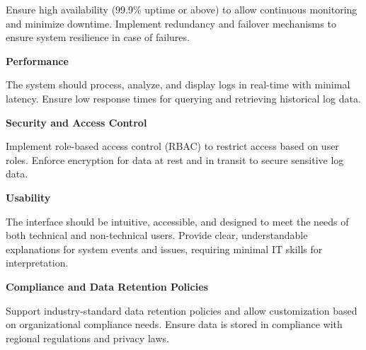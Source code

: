 Ensure high availability (99.9\% uptime or above) to allow continuous monitoring and minimize downtime. Implement redundancy and failover mechanisms to ensure system resilience in case of failures.

\textbf{Performance}

The system should process, analyze, and display logs in real-time with minimal latency. Ensure low response times for querying and retrieving historical log data.

\textbf{Security and Access Control}

Implement role-based access control (RBAC) to restrict access based on user roles. Enforce encryption for data at rest and in transit to secure sensitive log data.

\textbf{Usability}

The interface should be intuitive, accessible, and designed to meet the needs of both technical and non-technical users. Provide clear, understandable explanations for system events and issues, requiring minimal IT skills for interpretation.

\textbf{Compliance and Data Retention Policies}

Support industry-standard data retention policies and allow customization based on organizational compliance needs. Ensure data is stored in compliance with regional regulations and privacy laws.

 

